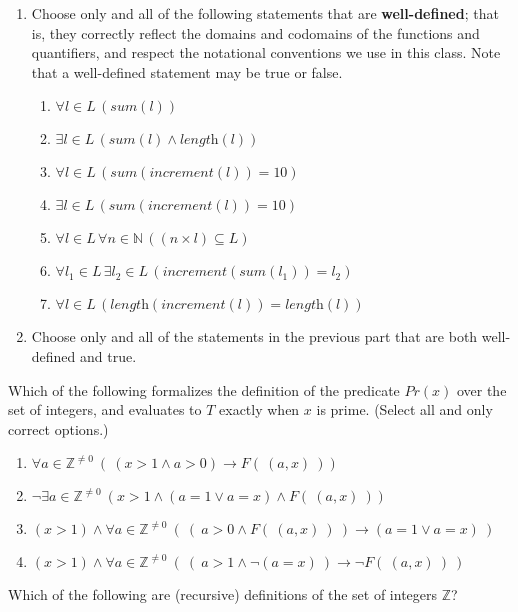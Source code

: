 \documentclass[12pt, oneside]{article}
\begin{document}
\begin{enumerate}
    \newpage
    \item Choose only and all of the following statements that are \textbf{well-defined}; that is, they correctly reflect the domains and codomains of the functions and quantifiers, and respect the notational conventions we use in this class. Note that a well-defined statement may be true or false.
    \begin{multicols}{2}    
    \begin{enumerate}
        \item $\forall l \in L \, (\textit{sum}(l))$
        \item $\exists l \in L \, (\textit{sum}(l) \land \textit{length}(l))$
        \item $\forall l \in L \, (\textit{sum}(\textit{increment}(l)) = 10)$
        \item $\exists l \in L \, (\textit{sum}(\textit{increment}(l)) = 10)$
        \item $\forall l \in L \, \forall n \in \mathbb{N} \, ((n \times l) \subseteq L)$
        \item $\forall l_1 \in L \, \exists l_2 \in L \, (\textit{increment}(\textit{sum}(l_1)) = l_2)$
        \item $\forall l \in L \, (\textit{length}(\textit{increment}(l)) = \textit{length}(l))$
    \end{enumerate}
    \end{multicols}
    
    \item Choose only and all of the statements in the previous part that are both well-defined and true.
\end{enumerate}
Which of the following formalizes the definition of the predicate
$Pr(x)$ over the set of integers, and evaluates to $T$ exactly when 
$x$ is prime. (Select all and only correct options.)
\begin{enumerate}
    \item $\forall a \in \mathbb{Z}^{\neq 0}~( ~(x > 1 \land a >0) \to F(~(a,x)~))$
    \item $\lnot \exists a \in \mathbb{Z}^{\neq 0} ~(x > 1 \land (a=1 \lor a=x) \land F(~(a,x)~))$
    \item $(x > 1) \land \forall a \in \mathbb{Z}^{\neq 0}~( ~(~ a>0 \land F(~(a,x)~)~) \to (a=1 \lor a=x)~)$
    \item $(x > 1) \land \forall a \in \mathbb{Z}^{\neq 0}~( ~(~ a>1 \land \lnot (a=x) ~) \to \lnot F(~(a,x)~)~)$
\end{enumerate}
Which of the following are (recursive) definitions of the set of integers $\mathbb{Z}$?
\end{document}
